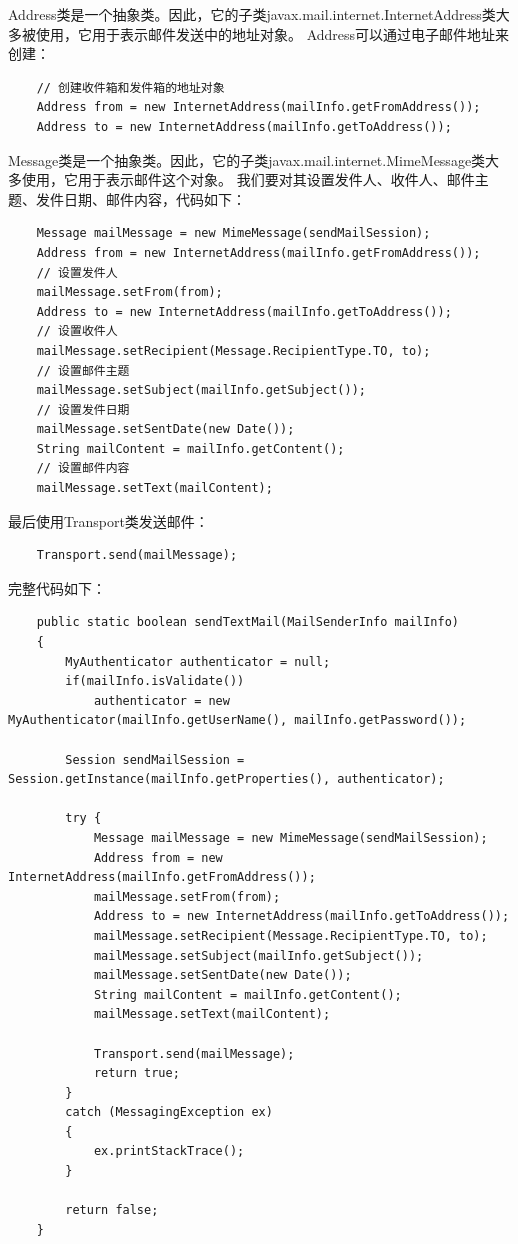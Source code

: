 \documentclass[a4paper,left=2.5cm,right=2.5cm,11pt]{article}
\begin{document}
	Address类是一个抽象类。因此，它的子类javax.mail.internet.InternetAddress类大多被使用，它用于表示邮件发送中的地址对象。
	Address可以通过电子邮件地址来创建：
	\begin{lstlisting}
	// 创建收件箱和发件箱的地址对象
	Address from = new InternetAddress(mailInfo.getFromAddress());
	Address to = new InternetAddress(mailInfo.getToAddress());
	\end{lstlisting}

	Message类是一个抽象类。因此，它的子类javax.mail.internet.MimeMessage类大多使用，它用于表示邮件这个对象。
	我们要对其设置发件人、收件人、邮件主题、发件日期、邮件内容，代码如下：
	\begin{lstlisting}
	Message mailMessage = new MimeMessage(sendMailSession);
	Address from = new InternetAddress(mailInfo.getFromAddress());
	// 设置发件人
	mailMessage.setFrom(from);
	Address to = new InternetAddress(mailInfo.getToAddress());
	// 设置收件人
	mailMessage.setRecipient(Message.RecipientType.TO, to);
	// 设置邮件主题
	mailMessage.setSubject(mailInfo.getSubject());
	// 设置发件日期
	mailMessage.setSentDate(new Date());
	String mailContent = mailInfo.getContent();
	// 设置邮件内容
	mailMessage.setText(mailContent);
	\end{lstlisting}

	最后使用Transport类发送邮件：
	\begin{lstlisting}
	Transport.send(mailMessage);
	\end{lstlisting}

	完整代码如下：
	\begin{lstlisting}
	public static boolean sendTextMail(MailSenderInfo mailInfo)
    {
        MyAuthenticator authenticator = null;
        if(mailInfo.isValidate())
            authenticator = new MyAuthenticator(mailInfo.getUserName(), mailInfo.getPassword());

        Session sendMailSession = Session.getInstance(mailInfo.getProperties(), authenticator);

        try {
            Message mailMessage = new MimeMessage(sendMailSession);
            Address from = new InternetAddress(mailInfo.getFromAddress());
            mailMessage.setFrom(from);
            Address to = new InternetAddress(mailInfo.getToAddress());
            mailMessage.setRecipient(Message.RecipientType.TO, to);
            mailMessage.setSubject(mailInfo.getSubject());
            mailMessage.setSentDate(new Date());
            String mailContent = mailInfo.getContent();
            mailMessage.setText(mailContent);

            Transport.send(mailMessage);
            return true;
        }
        catch (MessagingException ex)
        {
            ex.printStackTrace();
        }

        return false;
    }
	\end{lstlisting}
\end{document}
